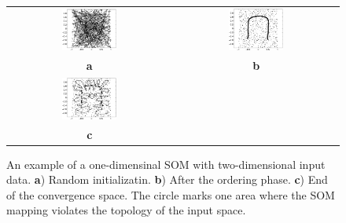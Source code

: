 \begin{enumerate}
\begin{solution}
    \begin{figure}[h]
      \centering
      \begin{tabular}{cc}
        \includegraphics[width=0.35\textwidth]{v121-f1.eps} &
        \includegraphics[width=0.35\textwidth]{v121-f2.eps} \\
        {\bf a} &{\bf b}\\
        \includegraphics[width=0.35\textwidth]{v121-f3f.eps} &\\
        {\bf c} &
      \end{tabular}
      \caption{An example of a one-dimensinal SOM with two-dimensional input
        data.  {\bf a}) Random initializatin. {\bf b}) After the ordering
        phase. {\bf c}) End of the convergence space. The circle marks one
        area where the SOM mapping violates the topology of the input space.}
      \label{fig:som}
    \end{figure}


  \end{solution}

\end{enumerate}

